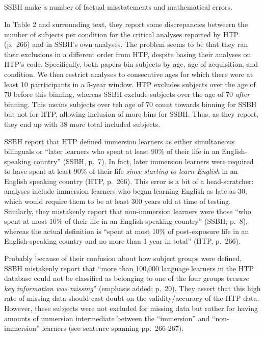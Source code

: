 \documentclass[
  english,
  doc,floatsintext]{apa6}
\begin{document}
\begin{appendix}
\section{}
SSBH make a number of factual misstatements and mathematical errors.

In Table 2 and surrounding text, they report some discrepancies betweern
the number of subjects per condition for the critical analyses reported
by HTP (p.~266) and in SSBH's own analyses. The problem seems to be that
they ran their exclusions in a different order from HTP, despite basing
their analyses on HTP's code. Specifically, both papers bin subjects by
age, age of acquisition, and condition. We then restrict analyses to
consecutive ages for which there were at least 10 parrticipants in a
5-year window. HTP excludes subjects over the age of 70 before this
binning, whereas SSBH exclude subjects over the age of 70 \emph{after}
binning. This means subjects over teh age of 70 count towards binning
for SSBH but not for HTP, allowing inclusion of more bins for SSBH.
Thus, as they report, they end up with 38 more total included subjects.

SSBH report that HTP defined immersion learners as either simultaneous
bilinguals or ``later learners who spent at least 90\% of their life in
an English-speaking country'' (SSBH, p.~7). In fact, later immersion
learners were required to have spent at least 90\% of their life
\emph{since starting to learn English} in an English speaking country
(HTP, p.~266). This error is a bit of a head-scratcher: analyses include
immersion learners who began learning English as late as 30, which would
require them to be at least 300 years old at time of testing. Similarly,
they mistakenly report that non-immersion learners were those ``who
spent at most 10\% of their life in an English-speaking country'' (SSBH,
p.~8), whereas the actual definition is ``spent at most 10\% of
post-exposure life in an English-speaking country and no more than 1
year in total'' (HTP, p.~266).

Probably because of their confusion about how subject groups were
defined, SSBH mistakenly report that ``more than 100,000 language
learners in the HTP database could not be classified as belonging to one
of the four groups \emph{because key information was missing}''
(emphasis added; p.~20). They assert that this high rate of missing data
should cast doubt on the validity/accuracy of the HTP data. However,
these subjects were not excluded for missing data but rather for having
amounts of immersion intermediate between the ``immersion'' and
``non-immersion'' learners (see sentence spanning pp.~266-267).


\end{appendix}
\end{document}

